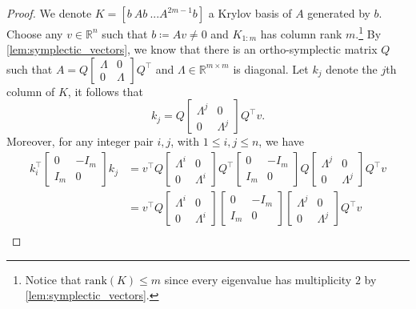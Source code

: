 \documentclass[10pt,twoside,dvipsnames]{siamart1116}
\numberwithin{algorithm}{section}
\numberwithin{equation}{section}
\begin{document}
	\begin{proof}
	We denote $K=[b\ Ab\ ...A^{2m-1}b]$ a Krylov basis of $A$ generated by $b$. Choose any $v\in\mathbb{R}^n$ such that $b\coloneq Av\neq 0$ and $K_{1:m}$ has column rank $m$.\footnote{Notice that $\mathrm{rank}(K)\leq m$ since every eigenvalue has multiplicity $2$ by \cref{lem:symplectic_vectors}.} By \cref{lem:symplectic_vectors}, we know that there is an ortho-symplectic matrix $Q$ such that $A=Q\left[\begin{smallmatrix}
	\Lambda&0\\
	0&\Lambda
	\end{smallmatrix}\right]Q^\top $ and $\Lambda\in\mathbb{R}^{m\times m}$ is diagonal. Let $k_j$ denote the $j$th column of $K$, it follows that \begin{equation*}
		k_j = Q\begin{bmatrix}
	\Lambda^j&0\\
	0&\Lambda^j
	\end{bmatrix}Q^\top v.
	\end{equation*}
	Moreover, for any integer pair $i,j$, with $1\leq i,j\leq n$, we have
	\begin{align}
	\nonumber
		k_i^\top \begin{bmatrix}
		0&-I_m\\
		I_m&0
		\end{bmatrix}k_j &=v^\top Q\begin{bmatrix}
	\Lambda^i&0\\
	0&\Lambda^i
	\end{bmatrix}Q^\top \begin{bmatrix}
		0&-I_m\\
		I_m&0
		\end{bmatrix}Q\begin{bmatrix}
	\Lambda^j&0\\
	0&\Lambda^j
	\end{bmatrix}Q^\top v\\
	\nonumber
	&=v^\top Q\begin{bmatrix}
	\Lambda^i&0\\
	0&\Lambda^i
	\end{bmatrix}\begin{bmatrix}
		0&-I_m\\
		I_m&0
		\end{bmatrix}\begin{bmatrix}
	\Lambda^j&0\\
	0&\Lambda^j
	\end{bmatrix}Q^\top v\\
	\nonumber

\end{align}
\end{proof}
\end{document}
